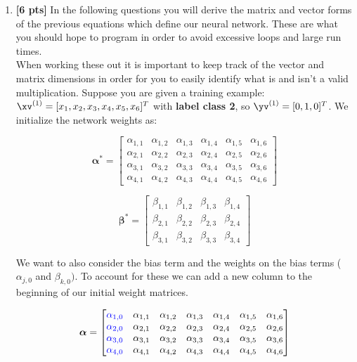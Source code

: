 \begin{enumerate}
\item \textbf{[6 pts]} In the following questions you will derive the matrix and vector forms of the previous equations which define our neural network. These are what you should hope to program in order to avoid excessive loops and large run times.\\
When working these out it is important to keep track of the vector and matrix dimensions in order for you to easily identify what is and isn't a valid multiplication. Suppose you are given a training example: $\xv^{(1)}=[x_1,x_2,x_3,x_4,x_5,x_6]^T$ with \textbf{label class 2}, so $\yv^{(1)}=[0,1,0]^T$. We initialize the network weights as:
\begin{center}
$$\boldsymbol{\alpha^*}=
    \begin{bmatrix}
    \alpha_{1,1} & \alpha_{1,2} & \alpha_{1,3} & \alpha_{1,4} & \alpha_{1,5} & \alpha_{1,6} \\
    \alpha_{2,1} & \alpha_{2,2} & \alpha_{2,3} & \alpha_{2,4} & \alpha_{2,5} & \alpha_{2,6} \\
    \alpha_{3,1} & \alpha_{3,2} & \alpha_{3,3} & \alpha_{3,4} & \alpha_{3,5} & \alpha_{3,6} \\
    \alpha_{4,1} & \alpha_{4,2} & \alpha_{4,3} & \alpha_{4,4} & \alpha_{4,5} & \alpha_{4,6}
    \end{bmatrix}$$
    
$$\boldsymbol{\beta^*}=
    \begin{bmatrix}
    \beta_{1,1} & \beta_{1,2} & \beta_{1,3} & \beta_{1,4} \\
    \beta_{2,1} & \beta_{2,2} & \beta_{2,3} & \beta_{2,4} \\
    \beta_{3,1} & \beta_{3,2} & \beta_{3,3} & \beta_{3,4}
    \end{bmatrix}
$$
\end{center}
    
We want to also consider the bias term and the weights on the bias terms (${\alpha}_{j,0}$ and ${\beta}_{k,0})$. To account for these we can add a new column to the beginning of our initial weight matrices. 

$$\boldsymbol{\alpha}=
    \begin{bmatrix}
    \textcolor{blue}{\alpha_{1,0}} & \alpha_{1,1} & \alpha_{1,2} & \alpha_{1,3} & \alpha_{1,4} & \alpha_{1,5} & \alpha_{1,6} \\
    \textcolor{blue}{\alpha_{2,0}} & \alpha_{2,1} & \alpha_{2,2} & \alpha_{2,3} & \alpha_{2,4} & \alpha_{2,5} & \alpha_{2,6} \\
    \textcolor{blue}{\alpha_{3,0}} & \alpha_{3,1} & \alpha_{3,2} & \alpha_{3,3} & \alpha_{3,4} & \alpha_{3,5} & \alpha_{3,6} \\
    \textcolor{blue}{\alpha_{4,0}} & \alpha_{4,1} & \alpha_{4,2} & \alpha_{4,3} & \alpha_{4,4} & \alpha_{4,5} & \alpha_{4,6}
    \end{bmatrix}$$
    

\end{enumerate}

